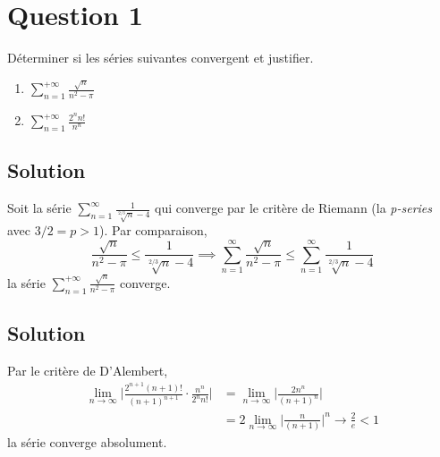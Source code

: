 \section*{Question 1}
	Déterminer si les séries suivantes convergent et justifier.
	\begin{enumerate}[label=\alph*)]
		\item $\sum\limits_{n=1}^{+\infty}\frac{\sqrt{n}}{n^2-\pi}$
		\item $\sum\limits_{n=1}^{+\infty}\frac{2^nn!}{n^n}$
	\end{enumerate}
\subsection{Solution}
	Soit la série $\sum_{n=1}^{\infty}\frac{1}{\sqrt[2/3]{n}-4}$ qui converge par le critère de Riemann (la \textit{p-series} avec $3/2=p>1$).
	Par comparaison,
	\[\frac{\sqrt{n}}{n^2-\pi}\leq \frac{1}{\sqrt[2/3]{n}-4} \implies \sum_{n=1}^{\infty}\frac{\sqrt{n}}{n^2-\pi}\leq \sum_{n=1}^{\infty}\frac{1}{\sqrt[2/3]{n}-4} \]
	la série  $\sum\limits_{n=1}^{+\infty}\frac{\sqrt{n}}{n^2-\pi}$ converge.
\subsection{Solution}
	Par le critère de D'Alembert,
	\begin{align*}
		\lim_{n \to \infty}\Big|\frac{2^{n+1}(n+1)!}{(n+1)^{n+1}}\cdot\frac{n^n}{2^n n!}\Big|&=\lim_{n \to \infty}\Big|\frac{2n^n}{(n+1)^n}\Big|\\
		&=2\lim_{n \to \infty}\Big|\frac{n}{(n+1)}\Big|^n  \longrightarrow \frac{2}{e}<1
	\end{align*}
	la série converge absolument.